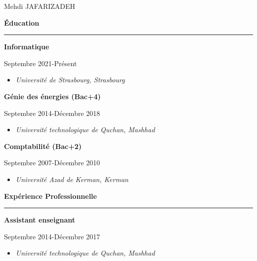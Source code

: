 \documentclass[a4paper]{letter}
\newcommand{\divider}{\rule{\linewidth}{0.9pt}}
\begin{document}
\begin{minipage}[t]{0.60\textwidth}


\setlength{\baselineskip}{1.5\baselineskip}
\vspace{0.7cm}

{\huge Mehdi JAFARIZADEH}

\vspace{1cm}


{\large \textbf{Éducation}}
\divider


{\textbf{Informatique}}

{\footnotesize Septembre 2021-Présent}
\begin{itemize}
    \footnotesize \item \textit{Université de Strasbourg, Strasbourg}
\end{itemize}

\vspace{3mm}

{ \textbf{Génie des énergies (Bac+4)}}

{\footnotesize Septembre 2014-Décembre 2018}
\begin{itemize}
    \footnotesize \item \textit{Université technologique de Quchan, Mashhad}
\end{itemize}

\vspace{3mm}

{ \textbf{Comptabilité (Bac+2)}}

{\footnotesize Septembre 2007-Décembre 2010}
\begin{itemize}
    \footnotesize \item \textit{Université Azad de Kerman, Kerman}
\end{itemize}



\vspace{0.8cm}


{\large \textbf{Expérience Professionnelle}}
\divider

{ \textbf{Assistant enseignant}}

{ \footnotesize Septembre 2014-Décembre 2017}
\begin{itemize}
    \footnotesize \item \textit{Université technologique de Quchan, Mashhad}
\end{itemize}


\end{minipage}
\end{document}
